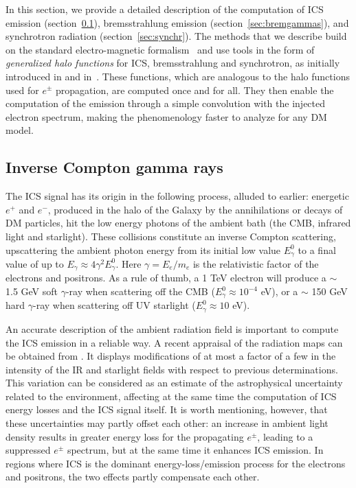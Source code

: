 \medskip

In this section, we provide a detailed description of the computation of ICS emission (section~\ref{sec:ICS}), bremsstrahlung emission (section~\ref{sec:bremgammas}), and synchrotron radiation (section~\ref{sec:synchr}).  The methods that we describe build on the standard electro-magnetic formalism~\cite{CRtransport,CRenergylosses} and use tools in the form of {\it generalized halo functions} for ICS, bremsstrahlung and synchrotron, as  initially introduced in \cite{PPPC4DMID} and  in~\cite{CRenergylosses}. These functions, which are analogous to the halo functions used for $e^\pm$ propagation, are computed once and for all. They then enable the computation of the emission through a simple convolution with the injected electron spectrum, making the phenomenology faster to analyze for any DM model.

\subsection{Inverse Compton gamma rays}\label{sec:ICS}
The ICS signal has its origin in the following process, alluded to earlier: energetic $e^+$ and $e^-$,  produced in the halo of the Galaxy by the annihilations or decays of DM particles, hit the low energy photons of the ambient bath (the CMB, infrared light and starlight). These collisions constitute an inverse Compton scattering, upscattering the ambient photon energy from its initial low value $E^0_\gamma$ to a final value of up to $E_\gamma \approx 4 \gamma^2 E^0_\gamma$. Here $\gamma = E_e/m_e$ is the relativistic factor of the electrons and positrons. 
As a rule of thumb, a 1 TeV electron will produce a $\sim$ 1.5 GeV soft $\gamma$-ray when scattering off the CMB ($E^0_\gamma \approx 10^{-4}$ eV), or a $\sim$ 150 GeV hard $\gamma$-ray when scattering off UV starlight ($E^0_\gamma \approx 10$ eV).

\smallskip

An accurate description of the ambient radiation field is important to compute the ICS emission in a reliable way. 
A recent appraisal of the radiation maps can be obtained from \cite{ISRFmaps}.  
It displays modifications of at most a factor of a few in the intensity of the IR and starlight fields with respect to previous determinations. 
This variation can be considered as an estimate of the astrophysical uncertainty related to the environment, affecting 
at the same time the computation of ICS energy losses and the ICS signal itself.
 It is worth mentioning, however, that these uncertainties may partly offset each other: an increase in ambient light density results in greater energy loss for the propagating $e^\pm$, leading to a suppressed $e^\pm$ spectrum, but at the same time it enhances ICS emission.
 In regions where ICS is the dominant energy-loss/emission process for the electrons and positrons, the two effects partly compensate each other.

